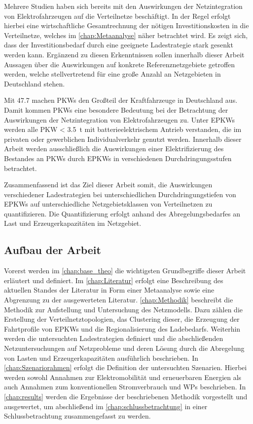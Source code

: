 Mehrere Studien haben sich bereits mit den Auswirkungen der Netzintegration von Elektrofahrzeugen auf die Verteilnetze beschäftigt. \cite{Agora2019} \cite{DEAGH2018} \cite{BCG2018}
In der Regel erfolgt hierbei eine wirtschaftliche Gesamtrechnung der nötigen Investitionskosten in die Verteilnetze, welches im \autoref{chap:Metaanalyse} näher betrachtet wird.
Es zeigt sich, dass der Investitionsbedarf durch eine geeignete Ladestrategie stark gesenkt werden kann.
Ergänzend zu diesen Erkenntnissen sollen innerhalb dieser Arbeit Aussagen über die Auswirkungen auf konkrete Referenznetzgebiete getroffen werden, welche stellvertretend für eine große Anzahl an Netzgebieten in Deutschland stehen.\medskip

Mit \SI{47.7}{\MioStk} \cite{KBA2020a} machen \glspl{PKW} den Großteil der Kraftfahrzeuge in Deutschland aus.
Damit kommen \glspl{PKW} eine besondere Bedeutung bei der Betrachtung der Auswirkungen der Netzintegration von Elektrofahrzeugen zu.
Unter \glspl{EPKW} werden alle \gls{PKW} \SI{< 3.5}{\tonne} mit batterieelektrischem Antrieb verstanden, die im privaten oder gewerblichen Individualverkehr genutzt werden. \cite{BNetzA2020}
Innerhalb dieser Arbeit werden ausschließlich die Auswirkungen einer Elektrifizierung des Bestandes an \glspl{PKW} durch \glspl{EPKW} in verschiedenen Durchdringungsstufen betrachtet.\medskip

Zusammenfassend ist das Ziel dieser Arbeit somit, die Auswirkungen verschiedener Lade\-strategien bei unterschiedlichen Durchdringungstiefen von \glspl{EPKW} auf unterschiedliche Netzgebietsklassen von Verteilnetzen zu quantifizieren.
Die Quantifizierung erfolgt anhand des Abregelungsbedarfes an Last und Erzeugerkapazitäten im Netzgebiet.


\subsection{Aufbau der Arbeit}

Vorerst werden im \autoref{chap:base_theo} die wichtigsten Grundbegriffe dieser Arbeit erläutert und definiert.
Im \autoref{chap:Literatur} erfolgt eine Beschreibung des aktuellen Standes der Literatur in Form einer Metaanalyse sowie eine Abgrenzung zu der ausgewerteten Literatur.
\autoref{chap:Methodik} beschreibt die Methodik zur Aufstellung und Untersuchung des Netzmodells.
Dazu zählen die Erstellung der Verteilnetztopologien, das Clustering dieser, die Erzeugung der Fahrtprofile von \glspl{EPKW} und die Regionalisierung des Ladebedarfs.
Weiterhin werden die untersuchten Ladestrategien definiert und die abschließenden Netzuntersuchungen auf Netzprobleme und deren Lösung durch die Abregelung von Lasten und Erzeugerkapazitäten ausführlich beschrieben.
In \autoref{chap:Szenariorahmen} erfolgt die Definition der untersuchten Szenarien.
Hierbei werden sowohl Annahmen zur Elektromobilität und erneuerbaren Energien als auch Annahmen zum konventionellen Stromverbrauch und \glspl{WP} beschrieben.
In \autoref{chap:results} werden die Ergebnisse der beschriebenen Methodik vorgestellt und ausgewertet, um abschließend im \autoref{chap:schlussbetrachtung} in einer Schlussbetrachtung zusammengefasst zu werden.

\clearpage
